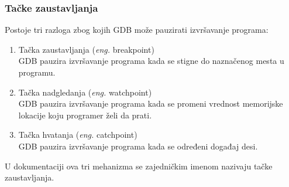 \documentclass[a4paper]{article}
\begin{document}
\subsubsection{Tačke zaustavljanja}
\label{subsec:gdbtackezaustavljanja}

Postoje tri razloga zbog kojih GDB može pauzirati izvršavanje programa: 
\begin{enumerate}
\item Tačka zaustavljanja (\textit{eng.} breakpoint) \\
GDB pauzira izvršavanje programa kada se stigne do naznačenog mesta u programu.
\item Tačka nadgledanja (\textit{eng.} watchpoint) \\ 
GDB pauzira izvršavanje programa kada se promeni vrednost memorijske lokacije koju programer želi da prati.
\item Tačka hvatanja (\textit{eng.} catchpoint) \\
GDB pauzira izvršavanje programa kada se određeni događaj desi.
\end{enumerate}
U dokumentaciji ova tri mehanizma se zajedničkim imenom nazivaju tačke zaustavljanja. 

% 
\end{document}
